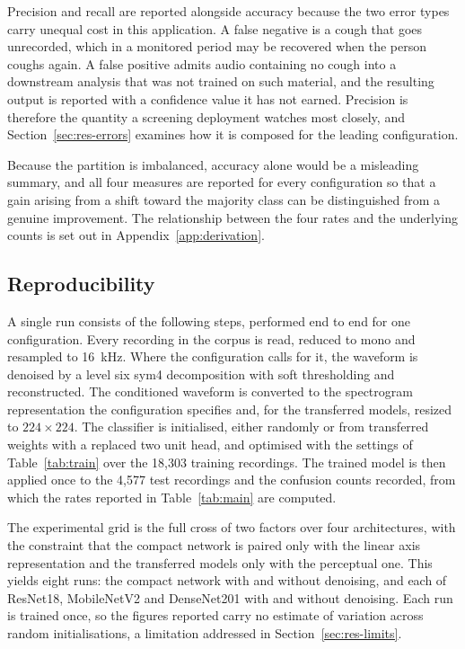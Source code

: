 \documentclass[pdflatex,sn-mathphys-num]{sn-jnl}
\begin{document}
Precision and recall are reported alongside accuracy because the two error
types carry unequal cost in this application. A false negative is a cough that
goes unrecorded, which in a monitored period may be recovered when the person
coughs again. A false positive admits audio containing no cough into a
downstream analysis that was not trained on such material, and the resulting
output is reported with a confidence value it has not earned. Precision is
therefore the quantity a screening deployment watches most closely, and
Section~\ref{sec:res-errors} examines how it is composed for the leading
configuration.

Because the partition is imbalanced, accuracy alone would be a misleading
summary, and all four measures are reported for every configuration so that a
gain arising from a shift toward the majority class can be distinguished from
a genuine improvement. The relationship between the four rates and the
underlying counts is set out in Appendix~\ref{app:derivation}.

\subsection{Reproducibility}\label{sec:s-repro}

A single run consists of the following steps, performed end to end for one
configuration. Every recording in the corpus is read, reduced to mono and
resampled to 16~kHz. Where the configuration calls for it, the waveform is
denoised by a level six sym4 decomposition with soft thresholding and
reconstructed. The conditioned waveform is converted to the spectrogram
representation the configuration specifies and, for the transferred models,
resized to $224 \times 224$. The classifier is initialised, either randomly or
from transferred weights with a replaced two unit head, and optimised with the
settings of Table~\ref{tab:train} over the 18,303 training recordings. The
trained model is then applied once to the 4,577 test recordings and the
confusion counts recorded, from which the rates reported in
Table~\ref{tab:main} are computed.

The experimental grid is the full cross of two factors over four
architectures, with the constraint that the compact network is paired only
with the linear axis representation and the transferred models only with the
perceptual one. This yields eight runs: the compact network with and without
denoising, and each of ResNet18, MobileNetV2 and DenseNet201 with and without
denoising. Each run is trained once, so the figures reported carry no estimate
of variation across random initialisations, a limitation addressed in
Section~\ref{sec:res-limits}.
\end{document}

